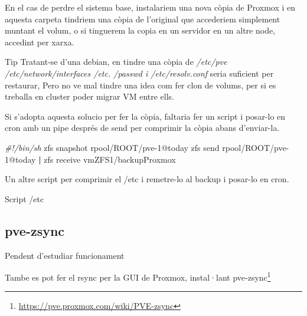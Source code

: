 \documentclass[
  10pt,
]{krantz}
\newenvironment{Shaded}{\begin{snugshade}}{\end{snugshade}}
\newcommand{\AttributeTok}[1]{\textcolor[rgb]{0.77,0.63,0.00}{#1}}
\newcommand{\CommentTok}[1]{\textcolor[rgb]{0.56,0.35,0.01}{\textit{#1}}}
\newcommand{\ExtensionTok}[1]{#1}
\newcommand{\FunctionTok}[1]{\textcolor[rgb]{0.00,0.00,0.00}{#1}}
\newcommand{\KeywordTok}[1]{\textcolor[rgb]{0.13,0.29,0.53}{\textbf{#1}}}
\newcommand{\NormalTok}[1]{#1}
\newcommand{\OperatorTok}[1]{\textcolor[rgb]{0.81,0.36,0.00}{\textbf{#1}}}
\newcommand{\StringTok}[1]{\textcolor[rgb]{0.31,0.60,0.02}{#1}}
\newcommand{\VariableTok}[1]{\textcolor[rgb]{0.00,0.00,0.00}{#1}}
\DeclareRobustCommand{\href}[2]{#2\footnote{\url{#1}}}
\begin{document}
En el cas de perdre el sistema base, instalariem una nova còpia de Proxmox i en aquesta carpeta tindriem una còpia de l'original que accederiem simplement muntant el volum, o si tinguerem la copia en un servidor en un altre node, accedint per xarxa.

\begin{rmdtip}{Tip}
Tratant-se d'una debian, en tindre una còpia de \emph{/etc/pve /etc/network/interfaces /etc. /passwd i /etc/resolv.conf} seria suficient per restaurar, Pero no ve mal tindre una idea com fer clon de volums, per si es treballa en cluster poder migrar VM entre ells.

\end{rmdtip}

Si s'adopta aquesta solucio per fer la còpia, faltaria fer un script i posar-lo en cron amb un pipe després de send per comprimir la còpia abans d'enviar-la.

\begin{Shaded}
\begin{Highlighting}[]
\CommentTok{\#!/bin/sh}
\ExtensionTok{zfs}\NormalTok{ snapshot rpool/ROOT/pve{-}1@today}
\ExtensionTok{zfs}\NormalTok{ send rpool/ROOT/pve{-}1@today }\KeywordTok{|} \ExtensionTok{zfs}\NormalTok{ receive vmZFS1/backupProxmox}
\end{Highlighting}
\end{Shaded}

Un altre script per comprimir el /etc i remetre-lo al backup i posar-lo en cron.

Script /etc

\begin{Shaded}
\end{Shaded}

\hypertarget{pve-zsync}{%
\subsection{pve-zsync}\label{pve-zsync}}

Pendent d'estudiar funcionament

Tambe es pot fer el rsync per la GUI de Proxmox, instal·lant \href{https://pve.proxmox.com/wiki/PVE-zsync}{pve-zsync}
\end{document}
